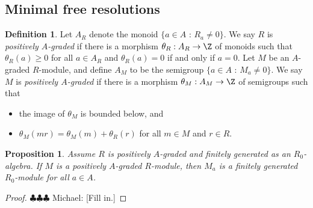\documentclass[12pt]{amsart}
\newtheorem{prop}[lemma]{Proposition}
\theoremstyle{definition}
\newtheorem{defn}[lemma]{Definition}
\theoremstyle{remark}
\newcommand{\michael}[1]{{\color{red} \sf $\clubsuit\clubsuit\clubsuit$ Michael: [#1]}}
\begin{document}
\subsection{Minimal free resolutions}

\begin{defn}
Let $A_R$ denote the monoid $\{ a \in A \text{ : } R_a \ne 0\}$. We say $R$ is \emph{positively $A$-graded} if there is a morphism $\theta_R: A_R \to \Z$ of monoids such that $\theta_R(a) \ge 0$ for all $a \in A_R$ and $\theta_R(a) = 0$ if and only if $a = 0$. Let $M$ be an $A$-graded $R$-module, and define $A_M$ to be the semigroup $\{a \in A \text{ : } M_a \ne 0\}$. We say $M$ is \emph{positively $A$-graded} if there is a morphism $\theta_M : A_M \to \Z$ of semigroups such that
\begin{itemize}
\item the image of $\theta_M$ is bounded below, and
\item $\theta_M(mr) =\theta_M(m) +  \theta_R(r)$ for all $m \in M$ and $r \in R$.
\end{itemize}
\end{defn}

\begin{prop}
Assume $R$ is positively $A$-graded and finitely generated as an $R_0$-algebra. If $M$ is a positively $A$-graded $R$-module, then $M_a$ is a finitely generated $R_0$-module for all $a \in A$.
\end{prop}

\begin{proof}
\michael{Fill in.}
\end{proof}
\end{document}
